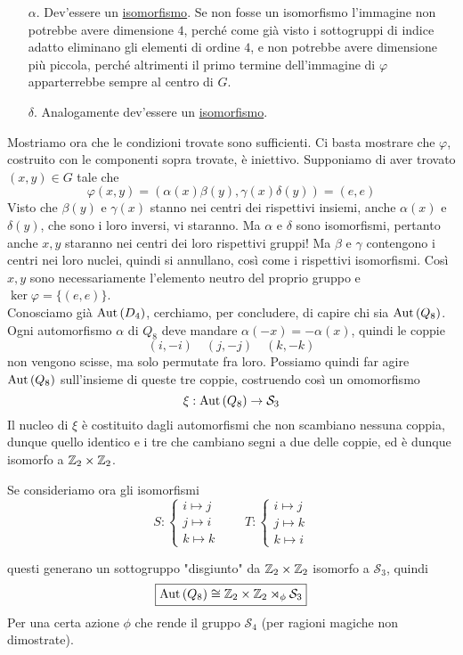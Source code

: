 \begin{multicols}{2}
\begin{itemize}
	 \item [$ \alpha $.] Dev'essere un \underline{isomorfismo}. Se non fosse un isomorfismo l'immagine non potrebbe avere dimensione $ 4 $, perché come già visto i sottogruppi di indice adatto eliminano gli elementi di ordine $ 4 $, e non potrebbe avere dimensione più piccola, perché altrimenti il primo termine dell'immagine di $ \varphi $ apparterrebbe sempre al centro di $ G $.
	 
	 \item [$ \delta $.] Analogamente dev'essere un \underline{isomorfismo}. 
	\end{itemize}
Mostriamo ora che le condizioni trovate sono sufficienti. Ci basta mostrare che $ \varphi $, costruito con le componenti sopra trovate, è iniettivo. Supponiamo di aver trovato $ (x, y) \in G $ tale che
\[ \varphi(x, y) = (\alpha(x)\beta(y), \gamma(x)\delta(y)) = (e, e) \]
Visto che $ \beta(y) $ e $ \gamma(x) $ stanno nei centri dei rispettivi insiemi, anche $ \alpha(x) $ e $ \delta(y) $, che sono i loro inversi, vi staranno. Ma $ \alpha $ e $ \delta $ sono isomorfismi, pertanto anche $ x, y $ staranno nei centri dei loro rispettivi gruppi! Ma $ \beta $ e $ \gamma $ contengono i centri nei loro nuclei, quindi si annullano, così come i rispettivi isomorfismi. Così $ x, y $ sono necessariamente l'elemento neutro del proprio gruppo e $ \ker\varphi = \{(e, e)\} $. \\

Conosciamo già $ \mathrm{Aut}\left( D_4 \right) $, cerchiamo, per concludere, di capire chi sia{\tiny } $ \mathrm{Aut}\left( Q_8 \right) $. \\

Ogni automorfismo $ \alpha $ di $ Q_8 $ deve mandare $ \alpha(-x) = -\alpha(x) $, quindi le coppie 
\[ (i, -i) \quad (j, -j) \quad (k, -k) \]
non vengono scisse, ma solo permutate fra loro. Possiamo quindi far agire $ \mathrm{Aut}\left( Q_8 \right) $ sull'insieme di queste tre coppie, costruendo così un omomorfismo
\[ \xi : \mathrm{Aut}\left( Q_8 \right) \to \mathcal{S}_3 \]
Il nucleo di $ \xi $ è costituito dagli automorfismi che non scambiano nessuna coppia, dunque quello identico e i tre che cambiano segni a due delle coppie, ed è dunque isomorfo a $ \mathbb{Z}_2 \times \mathbb{Z}_2 $.

Se consideriamo ora gli isomorfismi
\[ S: \begin{cases}
i \mapsto j \\ j \mapsto i \\ k \mapsto k
\end{cases}
\qquad T: \begin{cases}
i \mapsto j\\
j \mapsto k\\
k \mapsto i
\end{cases} \]


questi generano un sottogruppo "disgiunto" da $ \mathbb{Z}_2 \times \mathbb{Z}_2 $ isomorfo a $ \mathcal{S}_3 $, quindi
\[ \boxed{\mathrm{Aut}\left( Q_8 \right) \cong \mathbb{Z}_2 \times \mathbb{Z}_2 \rtimes_\phi \mathcal{S}_3} \] Per una certa azione $ \phi $ che rende il gruppo $ \mathcal{S}_4 $ (per ragioni magiche non dimostrate).




\end{multicols}


